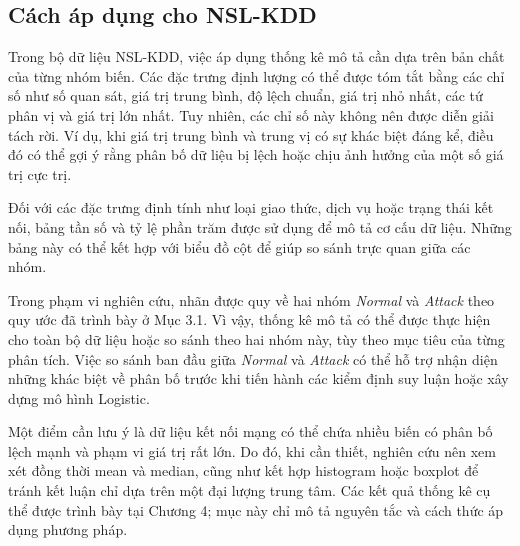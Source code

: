 \documentclass[../main.tex]{subfiles}
\begin{document}
\subsection{Cách áp dụng cho NSL-KDD}

Trong bộ dữ liệu NSL-KDD, việc áp dụng thống kê mô tả cần dựa trên bản chất của từng nhóm biến. Các đặc trưng định lượng có thể được tóm tắt bằng các chỉ số như số quan sát, giá trị trung bình, độ lệch chuẩn, giá trị nhỏ nhất, các tứ phân vị và giá trị lớn nhất. Tuy nhiên, các chỉ số này không nên được diễn giải tách rời. Ví dụ, khi giá trị trung bình và trung vị có sự khác biệt đáng kể, điều đó có thể gợi ý rằng phân bố dữ liệu bị lệch hoặc chịu ảnh hưởng của một số giá trị cực trị.

Đối với các đặc trưng định tính như loại giao thức, dịch vụ hoặc trạng thái kết nối, bảng tần số và tỷ lệ phần trăm được sử dụng để mô tả cơ cấu dữ liệu. Những bảng này có thể kết hợp với biểu đồ cột để giúp so sánh trực quan giữa các nhóm.

Trong phạm vi nghiên cứu, nhãn được quy về hai nhóm \textit{Normal} và \textit{Attack} theo quy ước đã trình bày ở Mục 3.1. Vì vậy, thống kê mô tả có thể được thực hiện cho toàn bộ dữ liệu hoặc so sánh theo hai nhóm này, tùy theo mục tiêu của từng phân tích. Việc so sánh ban đầu giữa \textit{Normal} và \textit{Attack} có thể hỗ trợ nhận diện những khác biệt về phân bố trước khi tiến hành các kiểm định suy luận hoặc xây dựng mô hình Logistic.

Một điểm cần lưu ý là dữ liệu kết nối mạng có thể chứa nhiều biến có phân bố lệch mạnh và phạm vi giá trị rất lớn. Do đó, khi cần thiết, nghiên cứu nên xem xét đồng thời mean và median, cũng như kết hợp histogram hoặc boxplot để tránh kết luận chỉ dựa trên một đại lượng trung tâm. Các kết quả thống kê cụ thể được trình bày tại Chương 4; mục này chỉ mô tả nguyên tắc và cách thức áp dụng phương pháp.
\end{document}
